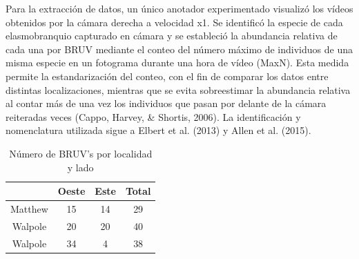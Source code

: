 \documentclass[a4paper, 11pt]{article}
\begin{document}
Para la extracción de datos, un único anotador experimentado visualizó los vídeos obtenidos por la cámara derecha a velocidad x1. Se identificó la especie de cada elasmobranquio capturado en cámara y se estableció la abundancia relativa de cada una por BRUV mediante el conteo del número máximo de individuos de una misma especie en un fotograma durante una hora de vídeo (MaxN). Esta medida permite la estandarización del conteo, con el fin de comparar los datos entre distintas localizaciones, mientras que se evita sobreestimar la abundancia relativa al contar más de una vez los individuos que pasan por delante de la cámara reiteradas veces (Cappo, Harvey, & Shortis, 2006). La identificación y nomenclatura utilizada sigue a Elbert et al. (2013) y Allen et al. (2015).\\
\begin{table}[htbp]
\begin{center}
\begin{tabular}{|c|c|c|c|}
\hline
 & Oeste & Este & Total\\
\hline
Matthew & 15 & 14 & 29\\
Walpole & 20 & 20 & 40\\
Walpole & 34 & 4 & 38\\
\hline
\end{tabular}
\caption{Número de BRUV's por localidad y lado}
\label{tabla:1}
\end{center}
\end{table}
\end{document}
